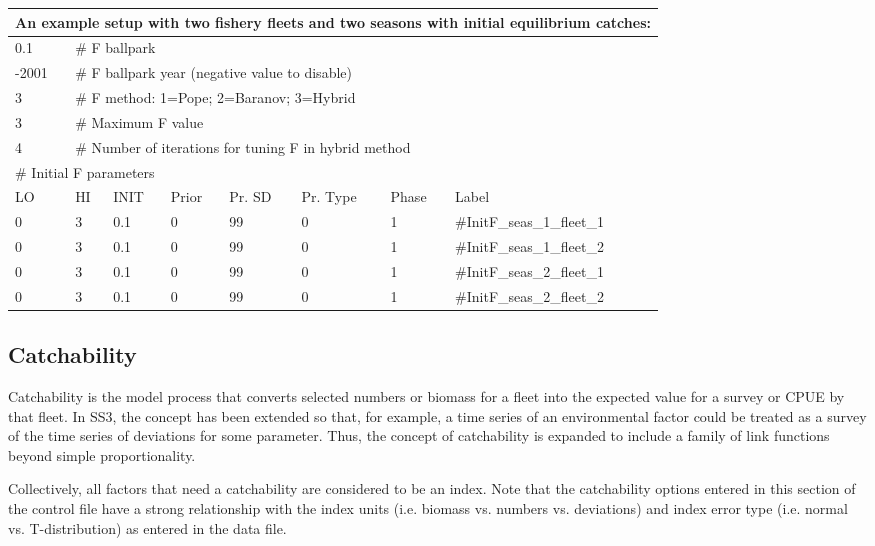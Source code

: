 \begin{longtable}{p{1.3cm} p{1.3cm} p{1.3cm} p{1.3cm} p{1.5cm} p{1.5cm} p{1.4cm} p{2.3cm}}
	\multicolumn{8}{l}{An example setup with two fishery fleets and two seasons with initial equilibrium catches:} \\
	\hline
	0.1 & \multicolumn{7}{l}{\# F ballpark} \Tstrut\Bstrut\\
	\hline
	-2001 & \multicolumn{7}{l}{\# F ballpark year (negative value to disable)} \Tstrut\Bstrut\\
	\hline
	3 & \multicolumn{7}{l}{\# F method: 1=Pope; 2=Baranov; 3=Hybrid} \Tstrut\Bstrut\\
	\hline
	3 & \multicolumn{7}{l}{\# Maximum F value} \Tstrut\Bstrut\\
	\hline
	4 & \multicolumn{7}{l}{\# Number of iterations for tuning F in hybrid method} \Tstrut\Bstrut\\
	\hline
	\multicolumn{8}{l}{\# Initial F parameters} \Tstrut\Bstrut\\
	LO & HI & INIT & Prior & Pr. SD & Pr. Type & Phase & Label \Bstrut\\
	\hline
	0 & 3 & 0.1 & 0 & 99 & 0 & 1 & \#InitF\_seas\_1\_fleet\_1 \Tstrut\Bstrut\\
	\hline
	0 & 3 & 0.1 & 0 & 99 & 0 & 1 & \#InitF\_seas\_1\_fleet\_2 \Tstrut\Bstrut\\
	\hline
	0 & 3 & 0.1 & 0 & 99 & 0 & 1 & \#InitF\_seas\_2\_fleet\_1 \Tstrut\Bstrut\\
	\hline
	0 & 3 & 0.1 & 0 & 99 & 0 & 1 & \#InitF\_seas\_2\_fleet\_2 \Tstrut\Bstrut\\
	\hline
\end{longtable}


\hypertarget{Qsetup}{}
\subsection{Catchability}
Catchability is the model process that converts selected numbers or biomass for a fleet into the expected value for a survey or CPUE by that fleet. In SS3, the concept has been extended so that, for example, a time series of an environmental factor could be treated as a survey of the time series of deviations for some parameter. Thus, the concept of catchability is expanded to include a family of link functions beyond simple proportionality.

Collectively, all factors that need a catchability are considered to be an index. Note that the catchability options entered in this section of the control file have a strong relationship with the index units (i.e. biomass vs. numbers vs. deviations) and index error type (i.e. normal vs. T-distribution) as entered in the data file.

